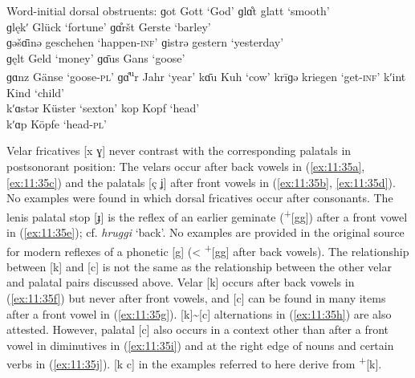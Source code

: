 \ea%
\label{ex:11:34}Word-initial dorsal obstruents:
\ea\label{ex:11:34a} ɡot \tab [gɔt] \tab Gott \tab ‘God’ 
\ex\label{ex:11:34b} ɡlɑ̊t \tab [glɑt] \tab glatt \tab ‘smooth’ \\
    ɡlękʹ \tab [glɛc] \tab Glück \tab ‘fortune’ 
\ex\label{ex:11:34c} ɡɑ̊ršt \tab [ʝɑrʃt] \tab Gerste \tab ‘barley’ \\
    ɡəšɑ̄inə \tab [ʝəʃɑːinə] \tab geschehen \tab ‘happen-\textsc{inf}’ 
\ex\label{ex:11:34d} ɡistrə \tab [ʝɪstrə] \tab gestern \tab ‘yesterday’ \\
    ɡęlt \tab [ʝɛlt] \tab Geld \tab ‘money’ 
\ex\label{ex:11:34e} ɡɑ̄us \tab [gɑːus] \tab  Gans \tab ‘goose’ \\
    ɡɑnz \tab [ʝænz] \tab Gänse \tab ‘goose-\textsc{pl}’ 
\ex\label{ex:11:34f} ɡɑ̊\textsuperscript{u}r \tab [ʝɑur] \tab Jahr \tab ‘year’ 
\ex\label{ex:11:34g} kɑ̄u \tab [kɑːu]  \tab  Kuh \tab ‘cow’ 
\ex\label{ex:11:34h} krīɡə \tab [kriːʝə] \tab kriegen \tab ‘get-\textsc{inf}’ 
\ex\label{ex:11:34i} kʹint \tab [cɪnt] \tab  Kind \tab ‘child’ \\
    kʹɑstər \tab [cæstər] \tab Küster \tab ‘sexton’ 
\ex\label{ex:11:34j} kop \tab [kɔp] \tab Kopf \tab ‘head’ \\
    kʹɑp \tab [cæp] \tab Köpfe \tab ‘head-\textsc{pl}’ 
\z 
\z 

Velar fricatives [x ɣ] never contrast with the corresponding palatals in postsonorant position: The velars occur after back vowels in (\ref{ex:11:35a}, \ref{ex:11:35c}) and the palatals [ç ʝ] after front vowels in (\ref{ex:11:35b}, \ref{ex:11:35d}). No examples were found in which dorsal fricatives occur after consonants. The lenis palatal stop [ɟ] is the reflex of an earlier geminate (\textsuperscript{+}[gg]) after a front vowel in (\ref{ex:11:35e}); cf.  \textit{hruggi} ‘back’. No examples are provided in the original source for modern reflexes of a phonetic [g] (< \textsuperscript{+}[gg] after back vowels). The relationship between [k] and [c] is not the same as the relationship between the other velar and palatal pairs discussed above. Velar [k] occurs after back vowels in (\ref{ex:11:35f}) but never after front vowels, and [c] can be found in many items after a front vowel in (\ref{ex:11:35g}). [k]{\textasciitilde}[c] alternations in (\ref{ex:11:35h}) are also attested. However, palatal [c] also occurs in a context other than after a front vowel in diminutives in (\ref{ex:11:35i}) and at the right edge of nouns and certain verbs in (\ref{ex:11:35j}). [k c] in the examples referred to here derive from  \textsuperscript{+}[k].


